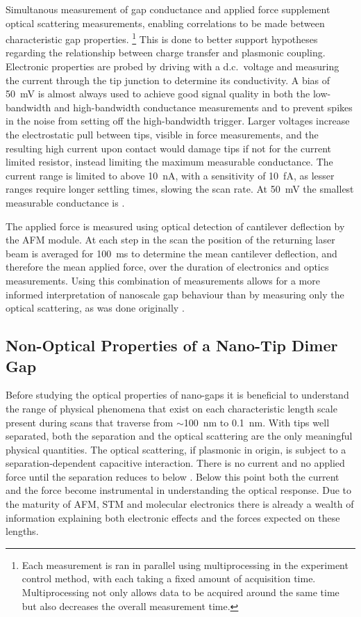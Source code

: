 \documentclass[a4paper]{article}
\begin{document}
Simultanous measurement of gap conductance and applied force supplement optical scattering measurements, enabling correlations to be made between characteristic gap properties.%
\footnote{Each measurement is ran in parallel using multiprocessing in the experiment control method, with each taking a fixed amount of acquisition time. Multiprocessing not only allows data to be acquired around the same time but also decreases the overall measurement time.}
This is done to better support hypotheses regarding the relationship between charge transfer and plasmonic coupling.
Electronic properties are probed by driving with a d.c.\ voltage and measuring the current through the tip junction to determine its conductivity. A bias of \SI{50}{mV} is almost always used to achieve good signal quality in both the low-bandwidth and high-bandwidth conductance measurements and to prevent spikes in the noise from setting off the high-bandwidth trigger. Larger voltages increase the electrostatic pull between tips, visible in force measurements, and the resulting high current upon contact would damage tips if not for the current limited resistor, instead limiting the maximum measurable conductance. The current range is limited to above \SI{10}{nA}, with a sensitivity of \SI{10}{fA}, as lesser ranges require longer settling times, slowing the scan rate. At \SI{50}{mV} the smallest measurable conductance is .

The applied force is measured using optical detection of cantilever deflection by the AFM module. At each step in the scan the position of the returning laser beam is averaged for \SI{100}{ms} to determine the mean cantilever deflection, and therefore the mean applied force, over the duration of electronics and optics measurements.%
Using this combination of measurements allows for a more informed interpretation of nanoscale gap behaviour than by measuring only the optical scattering, as was done originally \cite{savage2012}.

\subsection{Non-Optical Properties of a Nano-Tip Dimer Gap}

Before studying the optical properties of nano-gaps it is beneficial to understand the range of physical phenomena that exist on each characteristic length scale present during scans that traverse from $\sim$\SI{100}{nm} to \SI{0.1}{nm}. With tips well separated, both the separation and the optical scattering are the only meaningful physical quantities. The optical scattering, if plasmonic in origin, is subject to a separation-dependent capacitive interaction. There is no current and no applied force until the separation reduces to below . Below this point both the current and the force become instrumental in understanding the optical response. Due to the maturity of AFM, STM and molecular electronics there is already a wealth of information explaining both electronic effects and the forces expected on these lengths.
\end{document}

